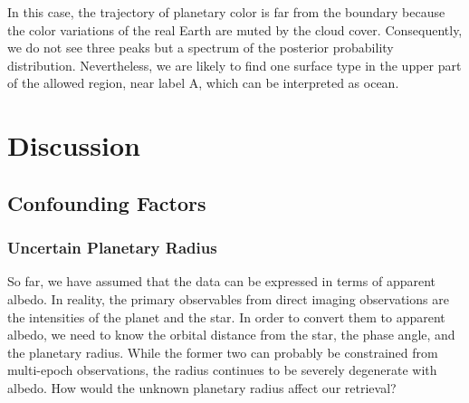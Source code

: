\documentclass[iop,numberedappendix,apj]{emulateapj}
\begin{document}
In this case, the trajectory of planetary color is far from the boundary because the color variations of the real Earth are muted by the cloud cover. 
Consequently, we do not see three peaks but a spectrum of the posterior probability distribution. 
Nevertheless, we are likely to find one surface type in the upper part of the allowed region, near label A, which can be interpreted as ocean. 


\section{Discussion}
\label{s:discussion}

\subsection{Confounding Factors}
\label{ss:confonting_factors}


\subsubsection{Uncertain Planetary Radius}


So far, we have assumed that the data can be expressed in terms of apparent albedo. 
In reality, the primary observables from direct imaging observations are the intensities of the planet and the star. 
In order to convert them to apparent albedo, we need to know the orbital distance from the star, the phase angle, and the planetary radius. 
While the former two can probably be constrained from multi-epoch observations, the radius continues to be severely degenerate with albedo. 
How would the unknown planetary radius affect our retrieval? 
\end{document}
